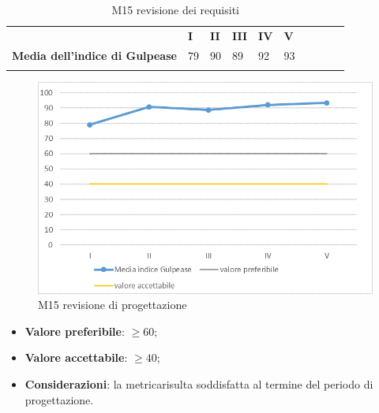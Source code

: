 \begin{longtable} {						
		>{}p{70mm}  		
		>{}p{8mm}		
		>{}p{8mm}		
		>{}p{8mm}		
		>{}p{8mm}		
		>{}p{8mm}		
		>{}p{8mm}
		>{}p{8mm}
		>{}p{8mm}
		>{}p{8mm}				
	}			
	\rowcolor{gray!50}
	\textbf{} & \textbf{I} & \textbf{II} & \textbf{III} & \textbf{IV} & \textbf{V} \TBstrut \\ [2mm]
	\textbf{Media dell'indice di Gulpease} & 79 & 90 & 89 & 92 & 93 \TBstrut \\ [2mm]
	\rowcolor{white}
	\caption{M15 revisione dei requisiti}
\end{longtable}
\begin{figure}[H] 	
	\includegraphics[width=\linewidth]{./img/grafici/RP20.png}	
	\caption{M15 revisione di progettazione}	
\end{figure}
\begin{itemize}
	\item \textbf{Valore preferibile}: $\ge60$;
	\item \textbf{Valore accettabile}: $\ge40$;
	\item \textbf{Considerazioni}: la metrica\glosp risulta soddisfatta al termine del periodo di progettazione\glo.
\end{itemize}

